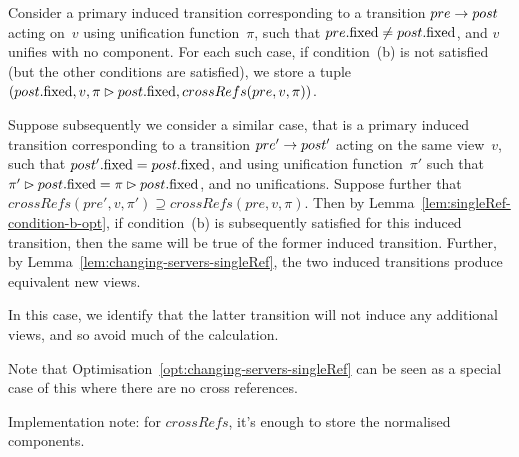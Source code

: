\begin{opt}
Consider a primary induced transition corresponding to a transition $pre
\stackrel{}\rightarrow post$ acting on~$v$ using unification function~$\pi$, such that
$pre.\mathrm{fixed} \ne post.\mathrm{fixed}$, and $v$ unifies with no component.  For each
such case, if condition~(b) is not satisfied (but the other conditions are
satisfied), we store a tuple $(post.\mathrm{fixed}, v, \pi \rhd post.\mathrm{fixed},
crossRefs(pre, v, \pi))$.

Suppose subsequently we consider a similar case, that is a primary induced
transition corresponding to a transition $pre' \stackrel{}\rightarrow post'$ acting on the
same view~$v$, such that $post'.\mathrm{fixed} = post.\mathrm{fixed}$, and using unification
function~$\pi'$ such that $\pi' \rhd post.\mathrm{fixed} = \pi \rhd
post.\mathrm{fixed}$, and no unifications.  Suppose further that $crossRefs(pre', v,
\pi') \supseteq crossRefs(pre, v, \pi)$.  Then by
Lemma~\ref{lem:singleRef-condition-b-opt}, if condition~(b) is subsequently
satisfied for this induced transition, then the same will be true of the
former induced transition.  Further, by
Lemma~\ref{lem:changing-servers-singleRef}, the two induced transitions
produce equivalent new views.

In this case, we identify that the latter transition will not induce any
additional views, and so avoid much of the calculation. 

Note that Optimisation~\ref{opt:changing-servers-singleRef} can be seen as a
special case of this where there are no cross references.
\end{opt}

Implementation note: for $crossRefs$, it's enough to store the normalised
components. 



